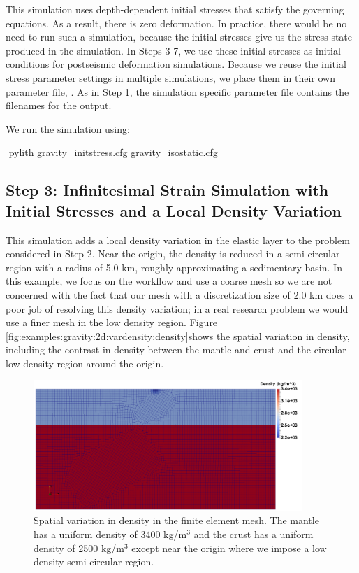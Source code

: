 This simulation uses depth-dependent initial stresses that satisfy the
governing equations. As a result, there is zero deformation. In
practice, there would be no need to run such a simulation, because the
initial stresses give us the stress state produced in the simulation.
In Steps 3-7, we use these initial stresses as initial conditions for
postseismic deformation simulations. Because we reuse the initial
stress parameter settings in multiple simulations, we place them in
their own parameter file, . As in
Step 1, the simulation specific parameter file contains the filenames
for the output.

We run the simulation using:
\begin{shell}
$$ pylith gravity_initstress.cfg gravity_isostatic.cfg
\end{shell}

\subsection{Step 3: Infinitesimal Strain Simulation with Initial Stresses and
a Local Density Variation}

This simulation adds a local density variation in the elastic layer
to the problem considered in Step 2. Near the origin, the density
is reduced in a semi-circular region with a radius of 5.0 km, roughly
approximating a sedimentary basin. In this example, we focus on the
workflow and use a coarse mesh so we are not concerned with the fact
that our mesh with a discretization size of 2.0 km does a poor job
of resolving this density variation; in a real research problem we
would use a finer mesh in the low density region. Figure \vref{fig:examples:gravity:2d:vardensity:density}shows
the spatial variation in density, including the contrast in density
between the mantle and crust and the circular low density region around
the origin.

\begin{figure}
  \includegraphics[width=4in]{examples/figs/grav2d_vardensity-density}
  \caption{Spatial variation in density in the finite element mesh. The mantle
    has a uniform density of 3400 kg/m$^{3}$ and the crust has a uniform
    density of 2500 kg/m$^{3}$ except near the origin where we impose
    a low density semi-circular region.}
  \label{fig:examples:gravity:2d:vardensity:density}
\end{figure}

